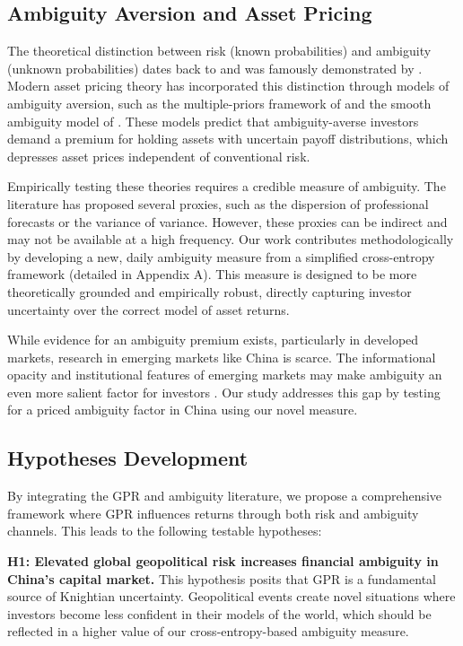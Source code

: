 \documentclass[preprint,12pt,authoryear]{elsarticle}
\begin{document}
\subsection{Ambiguity Aversion and Asset Pricing}

The theoretical distinction between risk (known probabilities) and ambiguity (unknown probabilities) dates back to \citet{knight1921risk} and was famously demonstrated by \citet{ellsberg1961risk}. Modern asset pricing theory has incorporated this distinction through models of ambiguity aversion, such as the multiple-priors framework of \citet{gilboa1989maxmin} and the smooth ambiguity model of \citet{klibanoff2005smooth}. These models predict that ambiguity-averse investors demand a premium for holding assets with uncertain payoff distributions, which depresses asset prices independent of conventional risk.

Empirically testing these theories requires a credible measure of ambiguity. The literature has proposed several proxies, such as the dispersion of professional forecasts \citep{brenner2018asset, ulrich2013inflation} or the variance of variance. However, these proxies can be indirect and may not be available at a high frequency. Our work contributes methodologically by developing a new, daily ambiguity measure from a simplified cross-entropy framework (detailed in Appendix A). This measure is designed to be more theoretically grounded and empirically robust, directly capturing investor uncertainty over the correct model of asset returns.

While evidence for an ambiguity premium exists, particularly in developed markets, research in emerging markets like China is scarce. The informational opacity and institutional features of emerging markets may make ambiguity an even more salient factor for investors \citep{easley2009ambiguity}. Our study addresses this gap by testing for a priced ambiguity factor in China using our novel measure.

\subsection{Hypotheses Development}

By integrating the GPR and ambiguity literature, we propose a comprehensive framework where GPR influences returns through both risk and ambiguity channels. This leads to the following testable hypotheses:

\textbf{H1: Elevated global geopolitical risk increases financial ambiguity in China's capital market.}
This hypothesis posits that GPR is a fundamental source of Knightian uncertainty. Geopolitical events create novel situations where investors become less confident in their models of the world, which should be reflected in a higher value of our cross-entropy-based ambiguity measure.
\end{document}
